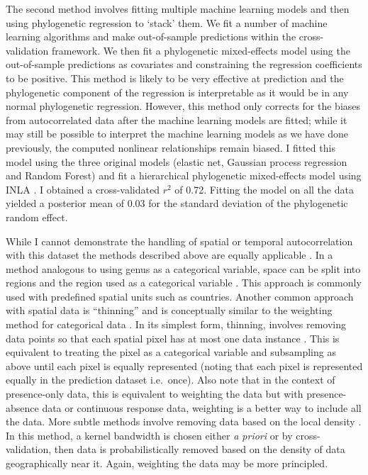 \documentclass[10pt,]{article}
\begin{document}
The second method involves fitting multiple machine learning models and then using phylogenetic regression to `stack' them. We fit a number of machine learning algorithms and make out-of-sample predictions within the cross-validation framework. We then fit a phylogenetic mixed-effects model using the out-of-sample predictions as covariates and constraining the regression coefficients to be positive. This method is likely to be very effective at prediction and the phylogenetic component of the regression is interpretable as it would be in any normal phylogenetic regression. However, this method only corrects for the biases from autocorrelated data after the machine learning models are fitted; while it may still be possible to interpret the machine learning models as we have done previously, the computed nonlinear relationships remain biased. I fitted this model using the three original models (elastic net, Gaussian process regression and Random Forest) and fit a hierarchical phylogenetic mixed-effects model using INLA \citep{INLA}. I obtained a cross-validated \(r^2\) of 0.72. Fitting the model on all the data yielded a posterior mean of 0.03 for the standard deviation of the phylogenetic random effect.

While I cannot demonstrate the handling of spatial or temporal autocorrelation with this dataset the methods described above are equally applicable \citep{elith2009species}. In a method analogous to using genus as a categorical variable, space can be split into regions and the region used as a categorical variable \citep{appelhans2015evaluating}. This approach is commonly used with predefined spatial units such as countries. Another common approach with spatial data is ``thinning'' and is conceptually similar to the weighting method for categorical data \cite{elith2010art}. In its simplest form, thinning, involves removing data points so that each spatial pixel has at most one data instance \citep{elith2010art, verbruggen2013improving}. This is equivalent to treating the pixel as a categorical variable and subsampling as above until each pixel is equally represented (noting that each pixel is represented equally in the prediction dataset i.e.~once). Also note that in the context of presence-only data, this is equivalent to weighting the data but with presence-absence data or continuous response data, weighting is a better way to include all the data. More subtle methods involve removing data based on the local density \citep{verbruggen2013improving}. In this method, a kernel bandwidth is chosen either \emph{a priori} or by cross-validation, then data is probabilistically removed based on the density of data geographically near it. Again, weighting the data may be more principled.
\end{document}
